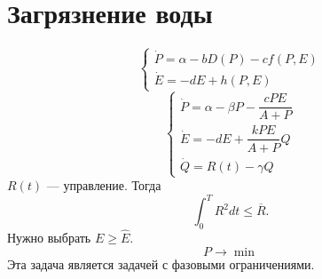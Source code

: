 \section{Загрязнение воды}
\begin{equation}
\begin{cases}
\dot{P} = \alpha - b D(P) - cf(P,E)\\
\dot{E} = -dE + h(P, E)
\end{cases}
\end{equation}
\begin{equation}
\begin{cases}
\dot{P} = \alpha - \beta P - \dfrac{cPE}{A + P}\\[8pt]
\dot{E} = -dE + \dfrac{kPE}{A + P} Q\\[8pt]
\dot{Q} = R(t) - \gamma Q
\end{cases}
\end{equation}
$R(t)$ --- управление. Тогда 
$$\int_{0}^{T} R^2 dt \leq \overline{R}.$$
Нужно выбрать $E \geq \hat{E}.$
$$P \to \min$$
Эта задача является задачей с фазовыми ограничениями.
